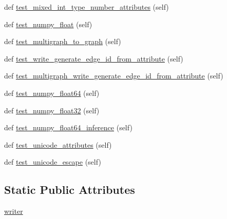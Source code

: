 \begin{DoxyCompactItemize}
\item 
def \hyperlink{classnetworkx_1_1readwrite_1_1tests_1_1test__graphml_1_1TestWriteGraphML_aad700d23a4daa9dd61878bfce75811ca}{test\+\_\+mixed\+\_\+int\+\_\+type\+\_\+number\+\_\+attributes} (self)
\item 
def \hyperlink{classnetworkx_1_1readwrite_1_1tests_1_1test__graphml_1_1TestWriteGraphML_ad577fc615ab63dae1e2a8ecd42ed441a}{test\+\_\+numpy\+\_\+float} (self)
\item 
def \hyperlink{classnetworkx_1_1readwrite_1_1tests_1_1test__graphml_1_1TestWriteGraphML_a5c2f1c79ada4602027fa50bc21a79537}{test\+\_\+multigraph\+\_\+to\+\_\+graph} (self)
\item 
def \hyperlink{classnetworkx_1_1readwrite_1_1tests_1_1test__graphml_1_1TestWriteGraphML_a245f283df580fcf1f033bc94afd82e01}{test\+\_\+write\+\_\+generate\+\_\+edge\+\_\+id\+\_\+from\+\_\+attribute} (self)
\item 
def \hyperlink{classnetworkx_1_1readwrite_1_1tests_1_1test__graphml_1_1TestWriteGraphML_a6f3dd709daefc455efe0393151b2428f}{test\+\_\+multigraph\+\_\+write\+\_\+generate\+\_\+edge\+\_\+id\+\_\+from\+\_\+attribute} (self)
\item 
def \hyperlink{classnetworkx_1_1readwrite_1_1tests_1_1test__graphml_1_1TestWriteGraphML_a2c12210ff366ba3b8027bd7b8d12d74f}{test\+\_\+numpy\+\_\+float64} (self)
\item 
def \hyperlink{classnetworkx_1_1readwrite_1_1tests_1_1test__graphml_1_1TestWriteGraphML_a7a16a89a20fd1dff37662891816c7334}{test\+\_\+numpy\+\_\+float32} (self)
\item 
def \hyperlink{classnetworkx_1_1readwrite_1_1tests_1_1test__graphml_1_1TestWriteGraphML_ab2ebf7d72c2b68fd9cb782f725ddbbcd}{test\+\_\+numpy\+\_\+float64\+\_\+inference} (self)
\item 
def \hyperlink{classnetworkx_1_1readwrite_1_1tests_1_1test__graphml_1_1TestWriteGraphML_aa3378d14dfa6e3c0d7a0aada047f8272}{test\+\_\+unicode\+\_\+attributes} (self)
\item 
def \hyperlink{classnetworkx_1_1readwrite_1_1tests_1_1test__graphml_1_1TestWriteGraphML_ab59ebc61c093743cbed54de66110a309}{test\+\_\+unicode\+\_\+escape} (self)
\end{DoxyCompactItemize}
\subsection*{Static Public Attributes}
\begin{DoxyCompactItemize}
\item 
\hyperlink{classnetworkx_1_1readwrite_1_1tests_1_1test__graphml_1_1TestWriteGraphML_a55ba66f3567dd6c9a4bfcde50eed7b3e}{writer}
\end{DoxyCompactItemize}
